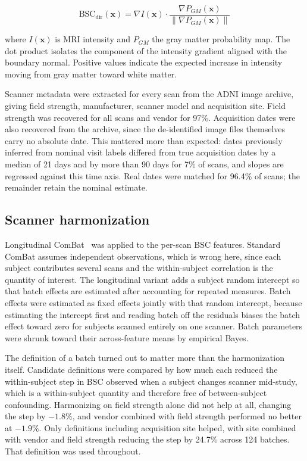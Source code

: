 \documentclass[blue]{ludusofficial}  %
\begin{document}
\begin{equation}
    \text{BSC}_{\text{dir}}(\mathbf{x}) = \nabla I(\mathbf{x}) \cdot \frac{\nabla P_{GM}(\mathbf{x})}{\|\nabla P_{GM}(\mathbf{x})\|}
\end{equation}

where $I(\mathbf{x})$ is MRI intensity and $P_{GM}$ the gray matter probability map. The dot product isolates the component of the intensity gradient aligned with the boundary normal. Positive values indicate the expected increase in intensity moving from gray matter toward white matter.

Scanner metadata were extracted for every scan from the ADNI image archive, giving field strength, manufacturer, scanner model and acquisition site. Field strength was recovered for all scans and vendor for 97\%. Acquisition dates were also recovered from the archive, since the de-identified image files themselves carry no absolute date. This mattered more than expected: dates previously inferred from nominal visit labels differed from true acquisition dates by a median of 21 days and by more than 90 days for 7\% of scans, and slopes are regressed against this time axis. Real dates were matched for 96.4\% of scans; the remainder retain the nominal estimate.

\subsection{Scanner harmonization}

Longitudinal ComBat~\cite{beer2020longitudinal} was applied to the per-scan BSC features. Standard ComBat assumes independent observations, which is wrong here, since each subject contributes several scans and the within-subject correlation is the quantity of interest. The longitudinal variant adds a subject random intercept so that batch effects are estimated after accounting for repeated measures. Batch effects were estimated as fixed effects jointly with that random intercept, because estimating the intercept first and reading batch off the residuals biases the batch effect toward zero for subjects scanned entirely on one scanner. Batch parameters were shrunk toward their across-feature means by empirical Bayes.

The definition of a batch turned out to matter more than the harmonization itself. Candidate definitions were compared by how much each reduced the within-subject step in BSC observed when a subject changes scanner mid-study, which is a within-subject quantity and therefore free of between-subject confounding. Harmonizing on field strength alone did not help at all, changing the step by $-1.8\%$, and vendor combined with field strength performed no better at $-1.9\%$. Only definitions including acquisition site helped, with site combined with vendor and field strength reducing the step by 24.7\% across 124 batches. That definition was used throughout.
\end{document}
